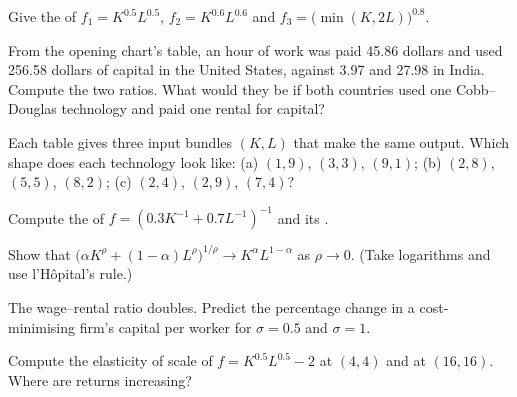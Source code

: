\begin{exercise}[$\star$]\label{exo:b1:technology:three}
Give the  of $f_1 = K^{0.5}L^{0.5}$, $f_2 = K^{0.6}L^{0.6}$ and
$f_3 = \bigl(\min(K, 2L)\bigr)^{0.8}$.
\end{exercise}

\begin{exercise}[$\star$]\label{exo:b1:technology:read}
From the opening chart's table, an hour of work was paid 45.86 dollars and
used 256.58 dollars of capital in the United States, against 3.97 and
27.98 in India. %
Compute the two ratios. What would they be if both countries used one
Cobb--Douglas technology and paid one rental for capital?
\end{exercise}

\begin{exercise}[$\star$]\label{exo:b1:technology:shapes}
Each table gives three input bundles $(K, L)$ that make the same output.
Which shape does each technology look like: (a) $(1, 9)$, $(3, 3)$, $(9, 1)$;
(b) $(2, 8)$, $(5, 5)$, $(8, 2)$; (c) $(2, 4)$, $(2, 9)$, $(7, 4)$?
\end{exercise}

\begin{exercise}[$\star\star$]\label{exo:b1:technology:ces-sigma}
Compute the  of $f = (0.3K^{-1} + 0.7L^{-1})^{-1}$ and its .
\end{exercise}

\begin{exercise}[$\star\star$]\label{exo:b1:technology:cd-limit}
Show that $\bigl(\alpha K^\rho + (1 - \alpha)L^\rho\bigr)^{1/\rho} \to K^\alpha L^{1-\alpha}$ as $\rho \to 0$. (Take
logarithms and use l'H\^opital's rule.)
\end{exercise}

\begin{exercise}[$\star\star$]\label{exo:b1:technology:predict}
The wage--rental ratio doubles. Predict the percentage change in a
cost-minimising firm's capital per worker for $\sigma = 0.5$ and $\sigma = 1$.
\end{exercise}

\begin{exercise}[$\star\star$]\label{exo:b1:technology:local}
Compute the elasticity of scale of $f = K^{0.5}L^{0.5} - 2$ at $(4, 4)$ and at
$(16, 16)$. Where are returns increasing?
\end{exercise}

